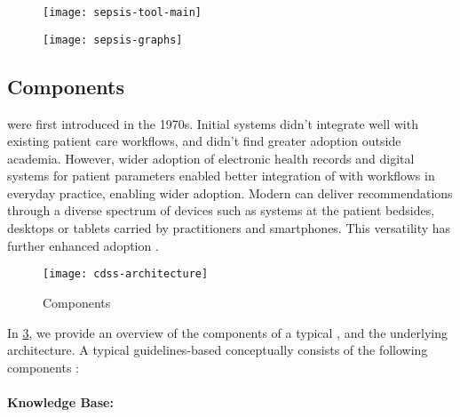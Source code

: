\begin{figure*}[t!]
  \begin{subfigure}[t]{0.69\textwidth}
    \centering
    \texttt{[image: sepsis-tool-main]}
    \label{fig:sepsis-tool-main}
  \end{subfigure}
  \begin{subfigure}[t]{0.3\textwidth}
    \centering
    \texttt{[image: sepsis-graphs]}
    \label{fig:sepsis-graphs-view}
  \end{subfigure}
  \caption{$\MediK{}$-based Sepsis Management \CDSS{}}\label{fig:sepsis-tool}
\end{figure*}

\subsection{\CDSS{} Components}

\CDSSs{} were first introduced in the 1970s. Initial systems
didn't integrate well with existing patient care workflows, and
didn't find greater adoption outside academia. However,
wider adoption of electronic health records and digital systems for
patient parameters enabled better integration of \CDSSs{} with
workflows in everyday practice, enabling wider adoption.
Modern \CDSS{} can deliver recommendations
through a diverse spectrum of devices such
as systems at the patient bedsides, desktops or tablets carried by
practitioners and smartphones. This versatility
has further enhanced \CDSSs{} adoption \cite{SuttonNature20}.

\begin{figure}[t!]
  \centering
  \texttt{[image: cdss-architecture]}
  \caption{\CDSS{} Components}\label{fig:cdss-architecture}
\end{figure}

In \figurename{} \ref{fig:cdss-architecture}, we provide an overview
of the components of a typical \CDSS{}, and the underlying architecture.
A typical guidelines-based \CDSS{} conceptually consists of the
following components \cite{SuttonNature20}:

\paragraph{Knowledge Base:}

